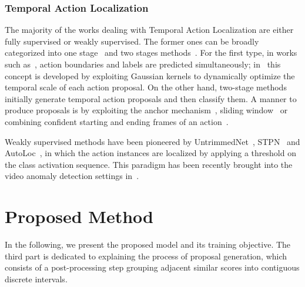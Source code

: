 \documentclass[runningheads]{llncs}
\begin{document}
\subsubsection{Temporal Action Localization}
The majority of the works dealing with Temporal Action Localization are either fully supervised or weakly supervised. The former ones can be broadly categorized into one stage~\cite{long2019gaussian, lin2017single} and two stages methods~\cite{xu2017r, zeng2019graph, lin2019bmn}. For the first type, in works such as~\cite{lin2017single}, action boundaries and labels are predicted simultaneously; in~\cite{long2019gaussian} this concept is developed by exploiting Gaussian kernels to dynamically optimize the temporal scale of each action proposal. On the other hand, two-stage methods initially generate temporal action proposals and then classify them. A manner to produce proposals is by exploiting the anchor mechanism~\cite{chao2018rethinking, gao2017turn, yang2020revisiting}, sliding window~\cite{shou2016temporal} or combining confident starting and ending frames of an action~\cite{lin2018bsn, lin2019bmn}.

Weakly supervised methods have been pioneered by UntrimmedNet~\cite{wang2017untrimmednets}, STPN~\cite{nguyen2018weakly} and AutoLoc~\cite{shou2018autoloc}, in which the action instances are localized by applying a threshold on the class activation sequence. This paradigm has been recently brought into the video anomaly detection settings in~\cite{wu2021weakly, lv2021localizing}. \section{Proposed Method}
In the following, we present the proposed model and its training objective. The third part is dedicated to explaining the process of proposal generation, which consists of a post-processing step grouping adjacent similar scores into contiguous discrete intervals. 
\end{document}
